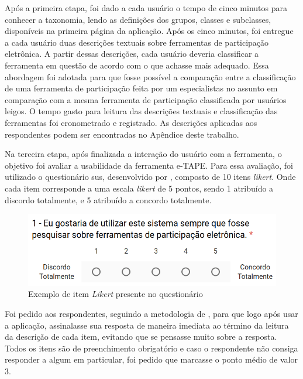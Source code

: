 \par
Após a primeira etapa, foi dado a cada usuário o tempo de cinco minutos para conhecer a taxonomia, lendo as definições dos grupos, classes e subclasses,
disponíveis na primeira página da aplicação. Após os cinco minutos, foi entregue a cada usuário duas descrições textuais sobre ferramentas de participação eletrônica.
A partir dessas descrições, cada usuário deveria classificar a ferramenta em questão de acordo com o que achasse mais adequado.
Essa abordagem foi adotada para que fosse possível a comparação entre a classificação de uma ferramenta de participação feita por um especialistas no assunto em comparação com
a mesma ferramenta de participação classificada por usuários leigos. O tempo gasto para leitura das descrições textuais e classificação das ferramentas foi cronometrado e registrado.
As descrições aplicadas aos respondentes podem ser encontradas no Apêndice deste trabalho.

\par
Na terceira etapa, após finalizada a interação do usuário com a ferramenta, o objetivo foi avaliar a usabilidade da ferramenta e-TAPE.
Para essa avaliação, foi utilizado o questionário \acrfull{sus}, desenvolvido por , composto de 10 itens \textit{likert}. 
Onde cada item corresponde a uma escala \textit{likert} de 5 pontos, sendo 1 atribuído a discordo totalmente, e 5 atribuído a concordo totalmente.

\begin{figure}[!ht]
    \centering
    \includegraphics[scale=0.5]{./figuras/exemplo_pergunta.png}
    \caption{Exemplo de item \textit{Likert} presente no questionário}
    \label{fig:exemplo-pergunta}
\end{figure}

\par
Foi pedido aos respondentes, seguindo a metodologia de , para que logo após usar a aplicação, assinalasse sua resposta de maneira 
imediata ao término da leitura da descrição de cada item, evitando que se pensasse muito sobre a resposta. 
Todos os itens são de preenchimento obrigatório e caso o respondente não consiga responder a algum em particular, foi pedido que marcasse o ponto médio de valor 3.  


